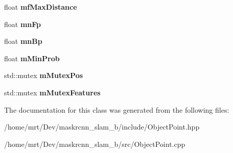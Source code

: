 \begin{DoxyCompactItemize}
float {\bfseries mf\+Max\+Distance}
\item 
\mbox{\label{classObjectPoint_a7e37ed3d865c22a50c9a003b9f9d69c3}} 
float {\bfseries mn\+Fp}
\item 
\mbox{\label{classObjectPoint_a59b71ed1fc9809df51dcb7e817da002e}} 
float {\bfseries mn\+Bp}
\item 
\mbox{\label{classObjectPoint_ac88069d8ba7be16793caf29f4bff6918}} 
float {\bfseries m\+Min\+Prob}
\item 
\mbox{\label{classObjectPoint_a1733bea98793cdedecd489593e649acf}} 
std\+::mutex {\bfseries m\+Mutex\+Pos}
\item 
\mbox{\label{classObjectPoint_aee62db63a3c8a20211f31a33d43ee0ec}} 
std\+::mutex {\bfseries m\+Mutex\+Features}
\end{DoxyCompactItemize}


The documentation for this class was generated from the following files\+:\begin{DoxyCompactItemize}
\item 
/home/mrt/\+Dev/maskrcnn\+\_\+slam\+\_\+b/include/Object\+Point.\+hpp\item 
/home/mrt/\+Dev/maskrcnn\+\_\+slam\+\_\+b/src/Object\+Point.\+cpp\end{DoxyCompactItemize}
